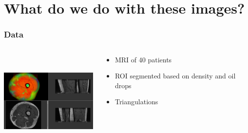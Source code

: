 \documentclass{beamer} %
\theoremstyle{definition} %
\begin{document}


\section{What do we do with these images?}




\begin{frame}
\frametitle{Data}
\begin{columns} %

\begin{column}{0.5\textwidth} %
\includegraphics[width=5cm, height=5cm]{../images/thigh_colored.png}

\end{column}
\begin{column}{0.5\textwidth} %
\begin{itemize}
\item MRI of 40 patients
\item  ROI segmented based on density and oil drops
\item Triangulations

\end{itemize}
 
\end{column}

\end{columns}



\end{frame}
\end{document}
